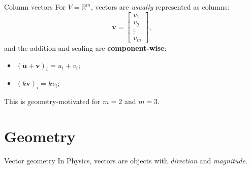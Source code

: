 \documentclass[10pt]{beamer}
\begin{document}
\begin{frame}{Column vectors}
    For $V = \mathbb R^m$, vectors are \textit{usually} represented as columns:
    $$
    \mathbf v = \begin{bmatrix}
        v_1 \\ v_2 \\ \vdots \\ v_m
    \end{bmatrix},
    $$
    and the addition and scaling are \textbf{component-wise}:
    \begin{itemize}
        \item $(\mathbf u + \mathbf v)_i = u_i + v_i$;
        \item $(k \mathbf v)_i = k v_i$;
    \end{itemize}

    This is geometry-motivated for $m=2$ and $m=3$.
\end{frame}

\section{Geometry}
\begin{frame}{Vector geometry}
    In Physics, vectors are objects with \textit{direction} and \textit{magnitude}.
\end{frame}
\end{document}
